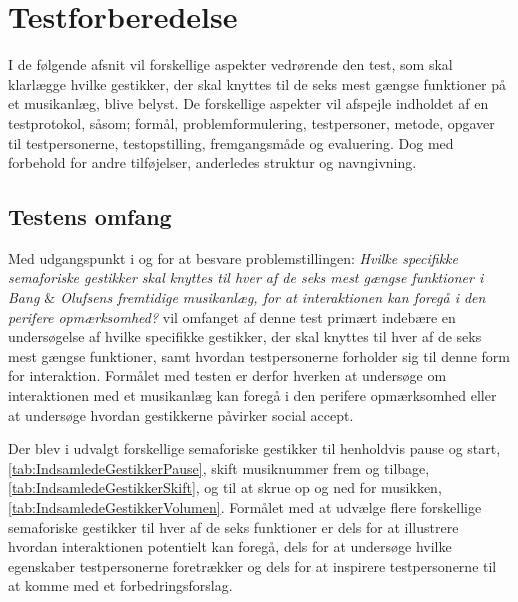 \section{Testforberedelse}
\label{Testforberedelse}
%
I de følgende afsnit vil forskellige aspekter vedrørende den test, som skal klarlægge hvilke gestikker, der skal knyttes til de seks mest gængse funktioner på et musikanlæg, blive belyst. De forskellige aspekter vil afspejle indholdet af en testprotokol, såsom; formål, problemformulering, testpersoner, metode, opgaver til testpersonerne, testopstilling, fremgangsmåde og evaluering. Dog med forbehold for andre tilføjelser, anderledes struktur og navngivning. 
%

\subsection{Testens omfang}
\label{TestensOmfangValgAfGestikker}
%
Med udgangspunkt i og for at besvare problemstillingen: \textit{Hvilke specifikke semaforiske gestikker skal knyttes til hver af de seks mest gængse funktioner i Bang $\&$ Olufsens fremtidige musikanlæg, for at interaktionen kan foregå i den perifere opmærksomhed?} vil omfanget af denne test primært indebære en undersøgelse af hvilke specifikke gestikker, der skal knyttes til hver af de seks mest gængse funktioner, samt hvordan testpersonerne forholder sig til denne form for interaktion. Formålet med testen er derfor hverken at undersøge om interaktionen med et musikanlæg kan foregå i den perifere opmærksomhed eller at undersøge hvordan gestikkerne påvirker social accept. 

Der blev i  udvalgt forskellige semaforiske gestikker til henholdvis pause og start, \autoref{tab:IndsamledeGestikkerPause}, skift musiknummer frem og tilbage, \autoref{tab:IndsamledeGestikkerSkift}, og til at skrue op og ned for musikken, \autoref{tab:IndsamledeGestikkerVolumen}. Formålet med at udvælge flere forskellige semaforiske gestikker til hver af de seks funktioner er dels for at illustrere hvordan interaktionen potentielt kan foregå, dels for at undersøge hvilke egenskaber testpersonerne foretrækker og dels for at inspirere testpersonerne til at komme med et forbedringsforslag. 
%

